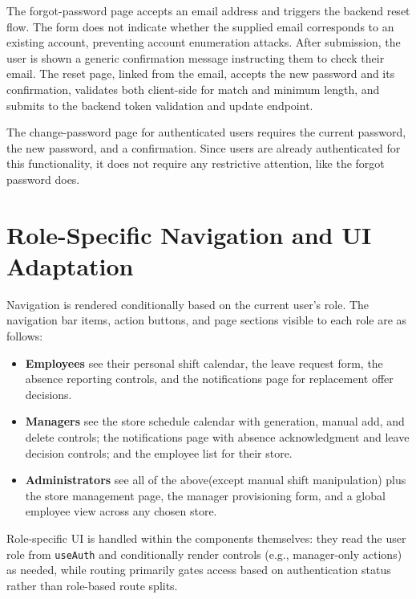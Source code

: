 \par The forgot-password page accepts an email address and triggers the backend reset flow. The form does not indicate whether the supplied email corresponds to an existing account, preventing account enumeration attacks. After submission, the user is shown a generic confirmation message instructing them to check their email. The reset page, linked from the email, accepts the new password and its confirmation, validates both client-side for match and minimum length, and submits to the backend token validation and update endpoint.

\par The change-password page for authenticated users requires the current password, the new password, and a confirmation. Since users are already authenticated for this functionality, it does not require any restrictive attention, like the forgot password does.

\section{Role-Specific Navigation and UI Adaptation}
\par Navigation is rendered conditionally based on the current user's role. The navigation bar items, action buttons, and page sections visible to each role are as follows:

\begin{itemize}
    \item \textbf{Employees} see their personal shift calendar, the leave request form, the absence reporting controls, and the notifications page for replacement offer decisions.
    \item \textbf{Managers} see the store schedule calendar with generation, manual add, and delete controls; the notifications page with absence acknowledgment and leave decision controls; and the employee list for their store.
    \item \textbf{Administrators} see all of the above(except manual shift manipulation) plus the store management page, the manager provisioning form, and a global employee view across any chosen store.
\end{itemize}

\par Role-specific UI is handled within the components themselves: they read the user role from \texttt{useAuth} and conditionally render controls (e.g., manager-only actions) as needed, while routing primarily gates access based on authentication status rather than role-based route splits.\cite{fireactUseAuth}

